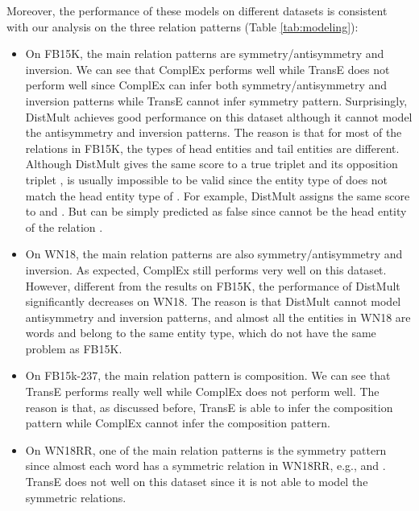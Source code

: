 \documentclass{article} \usepackage{iclr2019_conference,times}
\begin{document}
Moreover, the performance of these models on different datasets is consistent with our analysis on the three relation patterns (Table \ref{tab:modeling}):

\begin{itemize}
\item On FB15K, the main relation patterns are symmetry/antisymmetry and inversion. We can see that ComplEx performs well while TransE does not perform well since ComplEx can infer both symmetry/antisymmetry and inversion patterns while TransE cannot infer symmetry pattern. Surprisingly, DistMult achieves good performance on this dataset although it cannot model the antisymmetry and inversion patterns. The reason is that for most of the relations in FB15K, the types of head entities and tail entities are different. Although DistMult gives the same score to a true triplet  and its opposition triplet ,  is usually impossible to be valid since the entity type of  does not match the head entity type of . For example, DistMult assigns the same score to  and . But  can be simply predicted as false since  cannot be the head entity of the relation . 





\item On WN18, the main relation patterns are also symmetry/antisymmetry and inversion. As expected, ComplEx still performs very well on this dataset. However, different from the results on FB15K, the performance of DistMult significantly decreases on WN18. The reason is that DistMult cannot model antisymmetry and inversion patterns, and almost all the entities in WN18 are words and belong to the same entity type, which do not have the same problem as FB15K. 





\item On FB15k-237, the main relation pattern is composition. We can see that TransE performs really well while ComplEx does not perform well. The reason is that, as discussed before, TransE is able to infer the composition pattern while ComplEx cannot infer the composition pattern.

\item On WN18RR, one of the main relation patterns is the symmetry pattern since almost each word has a symmetric relation in WN18RR, e.g.,  and . TransE does not well on this dataset since it is not able to model the symmetric relations. \end{itemize}
\vspace{-5mm}
\end{document}
